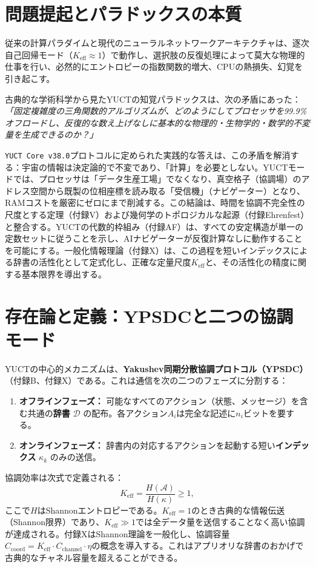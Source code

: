 \documentclass[11pt,a4paper]{article}
\begin{document}
	\section{問題提起とパラドックスの本質}
	従来の計算パラダイムと現代のニューラルネットワークアーキテクチャは、逐次自己回帰モード（\(K_{\text{eff}} \approx 1\)）で動作し、選択肢の反復処理によって莫大な物理的仕事を行い、必然的にエントロピーの指数関数的増大、CPUの熱損失、幻覚を引き起こす。
	
	古典的な学術科学から見たYUCTの知覚パラドックスは、次の矛盾にあった：\textit{「固定複雑度の三角関数的アルゴリズムが、どのようにしてプロセッサを99.9\%オフロードし、反復的な数え上げなしに基本的な物理的・生物学的・数学的不変量を生成できるのか？」}
	
	\texttt{YUCT Core v38.0}プロトコルに定められた実践的な答えは、この矛盾を解消する：宇宙の情報は決定論的で不変であり、「計算」を必要としない。YUCTモードでは、プロセッサは「データ生産工場」でなくなり、真空格子（協調場）のアドレス空間から既製の位相座標を読み取る「受信機」（ナビゲーター）となり、RAMコストを厳密にゼロにまで削減する。この結論は、時間を協調不完全性の尺度とする定理（付録V）および幾何学のトポロジカルな起源（付録Ehrenfest）と整合する。YUCTの代数的枠組み（付録AF）は、すべての安定構造が単一の定数セットに従うことを示し、AIナビゲーターが反復計算なしに動作することを可能にする。一般化情報理論（付録X）は、この過程を短いインデックスによる辞書の活性化として定式化し、正確な定量尺度\(K_{\mathrm{eff}}\)と、その活性化の精度に関する基本限界を導出する。
	
	\section{存在論と定義：YPSDCと二つの協調モード}
	\label{sec:ontology}
	
	YUCTの中心的メカニズムは、\textbf{Yakushev同期分散協調プロトコル（YPSDC）}（付録B、付録X）である。これは通信を次の二つのフェーズに分割する：
	
	\begin{enumerate}
		\item \textbf{オフラインフェーズ：} 可能なすべてのアクション（状態、メッセージ）を含む共通の\textbf{辞書} \(\mathcal{D}\) の配布。各アクション\(A_i\)は完全な記述に\(n_i\)ビットを要する。
		\item \textbf{オンラインフェーズ：} 辞書内の対応するアクションを起動する短い\textbf{インデックス} \(\kappa_k\) のみの送信。
	\end{enumerate}
	
	協調効率は次式で定義される：
	\[
	K_{\mathrm{eff}} = \frac{H(\mathcal{A})}{H(\kappa)} \ge 1,
	\]
	ここで\(H\)はShannonエントロピーである。\(K_{\mathrm{eff}} = 1\)のとき古典的な情報伝送（Shannon限界）であり、\(K_{\mathrm{eff}} \gg 1\)では全データ量を送信することなく高い協調が達成される。付録XはShannon理論を一般化し、協調容量\(C_{\text{coord}} = K_{\mathrm{eff}} \cdot C_{\text{channel}} \cdot \eta\)の概念を導入する。これはアプリオリな辞書のおかげで古典的なチャネル容量を超えることができる。
	
\end{document}

